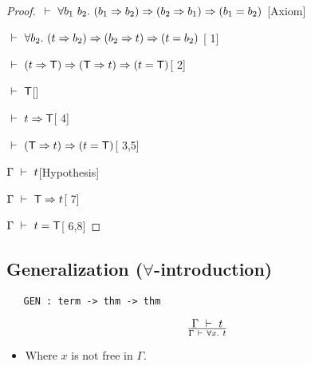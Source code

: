 \begin{proof}
\item $\turn\uquant{b_1\ b_2}(b_1\imp b_2)\imp(b_2\imp b_1)\imp(b_1=b_2)$
\hfill [Axiom]
\item $\ \vdash\ \forall b_2.\ (t\Rightarrow b_2)\Rightarrow(b_2\Rightarrow t)\Rightarrow(t=b_2)$
\hfill [ 1]
\item $\ \vdash\ (t\Rightarrow{\sf T})\Rightarrow({\sf T}\Rightarrow t)\Rightarrow(t={\sf T})$\hfill [ 2]
\item $\ \vdash\ {\sf T}$\hfill []
\item $\ \vdash\  t\Rightarrow{\sf T}$\hfill [ 4]
\item $\ \vdash\ ({\sf T}\Rightarrow t)\Rightarrow(t={\sf T})$\hfill [ 3,5]
\item $\Gamma \ \vdash\  t$\hfill [Hypothesis]
\item $\Gamma\ \vdash\ {\sf T}\Rightarrow t$\hfill [ 7]
\item $\Gamma\ \vdash\  t={\sf T}$\hfill [ 6,8]
\end{proof}


\subsection{\texorpdfstring{Generalization ($\forall$-introduction)}{Generalization (forall-introduction)}}%


\begin{holboxed}
\begin{verbatim}
   GEN : term -> thm -> thm
\end{verbatim}
\end{holboxed}

\label{sec:gen}

\vspace{12pt plus2pt minus1pt}

$$\Gamma\ \vdash\  t\over\Gamma\ \vdash\ \forall x.\  t$$
\begin{itemize}
\item Where $x$ is not free in $\Gamma$.
\end{itemize}

\vspace{12pt plus2pt minus1pt}

